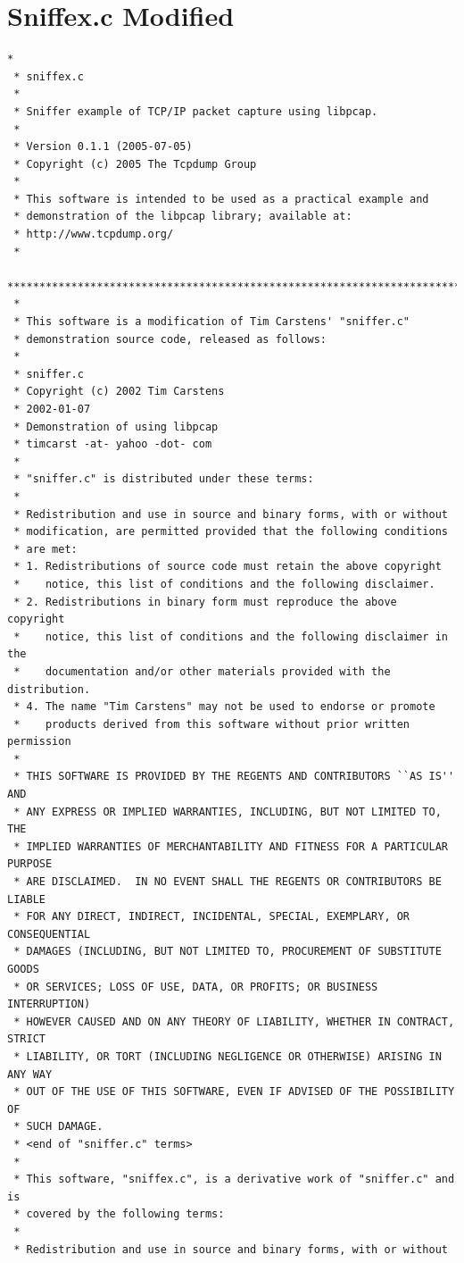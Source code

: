 \documentclass[12pt,english,oneside]{book}
\begin{document}
\chapter{Sniffex.c Modified}
\label{app:sniffex}
\lstset{language=C,frame=lines}
\begin{lstlisting}
*
 * sniffex.c
 *
 * Sniffer example of TCP/IP packet capture using libpcap.
 * 
 * Version 0.1.1 (2005-07-05)
 * Copyright (c) 2005 The Tcpdump Group
 *
 * This software is intended to be used as a practical example and 
 * demonstration of the libpcap library; available at:
 * http://www.tcpdump.org/
 *
 ****************************************************************************
 *
 * This software is a modification of Tim Carstens' "sniffer.c"
 * demonstration source code, released as follows:
 * 
 * sniffer.c
 * Copyright (c) 2002 Tim Carstens
 * 2002-01-07
 * Demonstration of using libpcap
 * timcarst -at- yahoo -dot- com
 * 
 * "sniffer.c" is distributed under these terms:
 * 
 * Redistribution and use in source and binary forms, with or without
 * modification, are permitted provided that the following conditions
 * are met:
 * 1. Redistributions of source code must retain the above copyright
 *    notice, this list of conditions and the following disclaimer.
 * 2. Redistributions in binary form must reproduce the above copyright
 *    notice, this list of conditions and the following disclaimer in the
 *    documentation and/or other materials provided with the distribution.
 * 4. The name "Tim Carstens" may not be used to endorse or promote
 *    products derived from this software without prior written permission
 *
 * THIS SOFTWARE IS PROVIDED BY THE REGENTS AND CONTRIBUTORS ``AS IS'' AND
 * ANY EXPRESS OR IMPLIED WARRANTIES, INCLUDING, BUT NOT LIMITED TO, THE
 * IMPLIED WARRANTIES OF MERCHANTABILITY AND FITNESS FOR A PARTICULAR PURPOSE
 * ARE DISCLAIMED.  IN NO EVENT SHALL THE REGENTS OR CONTRIBUTORS BE LIABLE
 * FOR ANY DIRECT, INDIRECT, INCIDENTAL, SPECIAL, EXEMPLARY, OR CONSEQUENTIAL
 * DAMAGES (INCLUDING, BUT NOT LIMITED TO, PROCUREMENT OF SUBSTITUTE GOODS
 * OR SERVICES; LOSS OF USE, DATA, OR PROFITS; OR BUSINESS INTERRUPTION)
 * HOWEVER CAUSED AND ON ANY THEORY OF LIABILITY, WHETHER IN CONTRACT, STRICT
 * LIABILITY, OR TORT (INCLUDING NEGLIGENCE OR OTHERWISE) ARISING IN ANY WAY
 * OUT OF THE USE OF THIS SOFTWARE, EVEN IF ADVISED OF THE POSSIBILITY OF
 * SUCH DAMAGE.
 * <end of "sniffer.c" terms>
 *
 * This software, "sniffex.c", is a derivative work of "sniffer.c" and is
 * covered by the following terms:
 *
 * Redistribution and use in source and binary forms, with or without

\end{lstlisting}
\end{document}
